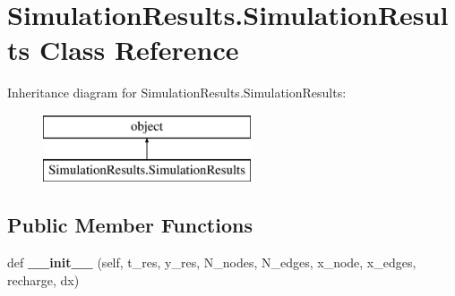 \hypertarget{class_simulation_results_1_1_simulation_results}{}\section{Simulation\+Results.\+Simulation\+Results Class Reference}
\label{class_simulation_results_1_1_simulation_results}
Inheritance diagram for Simulation\+Results.\+Simulation\+Results\+:\begin{figure}[H]
\begin{center}
\leavevmode
\includegraphics[height=2.000000cm]{class_simulation_results_1_1_simulation_results}
\end{center}
\end{figure}
\subsection*{Public Member Functions}
\begin{DoxyCompactItemize}
\item 
\hypertarget{class_simulation_results_1_1_simulation_results_a3200d3c4ed2fa4acab7420e20109a463}{}\label{class_simulation_results_1_1_simulation_results_a3200d3c4ed2fa4acab7420e20109a463} 
def {\bfseries \+\_\+\+\_\+init\+\_\+\+\_\+} (self, t\+\_\+res, y\+\_\+res, N\+\_\+nodes, N\+\_\+edges, x\+\_\+node, x\+\_\+edges, recharge, dx)
\end{DoxyCompactItemize}
